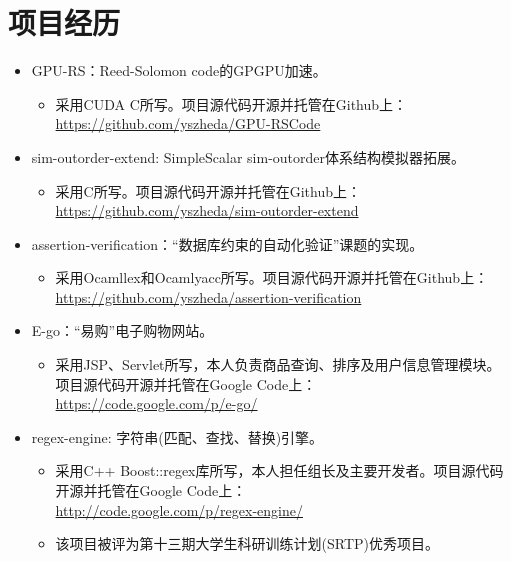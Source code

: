\documentclass[letterpaper]{article}
\begin{document}
\section*{项目经历}
\begin{itemize}
  \item GPU-RS：Reed-Solomon code的GPGPU加速。
	\begin{itemize}
	  \item 采用CUDA C所写。项目源代码开源并托管在Github上：\\
			  \url{https://github.com/yszheda/GPU-RSCode}
	\end{itemize}
  \item sim-outorder-extend: SimpleScalar sim-outorder体系结构模拟器拓展。
	\begin{itemize}
	  \item 采用C所写。项目源代码开源并托管在Github上：\\
			  \url{https://github.com/yszheda/sim-outorder-extend}
	\end{itemize}
  \item assertion-verification：``数据库约束的自动化验证''课题的实现。
	\begin{itemize}
	  \item 采用Ocamllex和Ocamlyacc所写。项目源代码开源并托管在Github上：\\
			  \url{https://github.com/yszheda/assertion-verification}
	\end{itemize}
  \item E-go：``易购''电子购物网站。
	\begin{itemize}
	  \item 采用JSP、Servlet所写，本人负责商品查询、排序及用户信息管理模块。项目源代码开源并托管在Google Code上：\\
			  \url{https://code.google.com/p/e-go/}
	\end{itemize}
  \item regex-engine: 字符串(匹配、查找、替换)引擎。
    \begin{itemize}
	  \item 采用C++ Boost::regex库所写，本人担任组长及主要开发者。项目源代码开源并托管在Google Code上：\\
			  \url{http://code.google.com/p/regex-engine/}
      \item 该项目被评为第十三期大学生科研训练计划(SRTP)优秀项目。
%
	\end{itemize}


\end{itemize}
\end{document}
